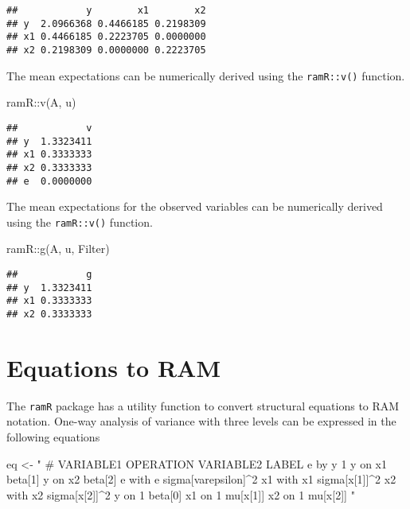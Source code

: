 \documentclass[
]{book}
\newenvironment{Shaded}{\begin{snugshade}}{\end{snugshade}}
\newcommand{\FunctionTok}[1]{\textcolor[rgb]{0.00,0.00,0.00}{#1}}
\newcommand{\NormalTok}[1]{#1}
\newcommand{\OtherTok}[1]{\textcolor[rgb]{0.56,0.35,0.01}{#1}}
\newcommand{\SpecialCharTok}[1]{\textcolor[rgb]{0.00,0.00,0.00}{#1}}
\newcommand{\StringTok}[1]{\textcolor[rgb]{0.31,0.60,0.02}{#1}}
\theoremstyle{definition}
\theoremstyle{definition}
\theoremstyle{definition}
\theoremstyle{remark}
\begin{document}
\begin{verbatim}
##            y        x1        x2
## y  2.0966368 0.4466185 0.2198309
## x1 0.4466185 0.2223705 0.0000000
## x2 0.2198309 0.0000000 0.2223705
\end{verbatim}

The mean expectations
can be numerically derived using the \texttt{ramR::v()} function.

\begin{Shaded}
\begin{Highlighting}[]
\NormalTok{ramR}\SpecialCharTok{::}\FunctionTok{v}\NormalTok{(A, u)}
\end{Highlighting}
\end{Shaded}

\begin{verbatim}
##            v
## y  1.3323411
## x1 0.3333333
## x2 0.3333333
## e  0.0000000
\end{verbatim}

The mean expectations for the observed variables
can be numerically derived using the \texttt{ramR::v()} function.

\begin{Shaded}
\begin{Highlighting}[]
\NormalTok{ramR}\SpecialCharTok{::}\FunctionTok{g}\NormalTok{(A, u, Filter)}
\end{Highlighting}
\end{Shaded}

\begin{verbatim}
##            g
## y  1.3323411
## x1 0.3333333
## x2 0.3333333
\end{verbatim}

\hypertarget{equations-to-ram-1}{%
\section{Equations to RAM}\label{equations-to-ram-1}}

The \texttt{ramR} package has a utility function
to convert structural equations to RAM notation.
One-way analysis of variance with three levels
can be expressed in the following equations

\begin{Shaded}
\begin{Highlighting}[]
\NormalTok{eq }\OtherTok{\textless{}{-}} \StringTok{"}
\StringTok{  \# VARIABLE1 OPERATION VARIABLE2 LABEL}
\StringTok{  e           by        y         1}
\StringTok{  y           on        x1        beta[1]}
\StringTok{  y           on        x2        beta[2]}
\StringTok{  e           with      e         sigma[varepsilon]\^{}2}
\StringTok{  x1          with      x1        sigma[x[1]]\^{}2}
\StringTok{  x2          with      x2        sigma[x[2]]\^{}2}
\StringTok{  y           on        1         beta[0]}
\StringTok{  x1          on        1         mu[x[1]]}
\StringTok{  x2          on        1         mu[x[2]]}
\StringTok{"}
\end{Highlighting}
\end{Shaded}
\end{document}
